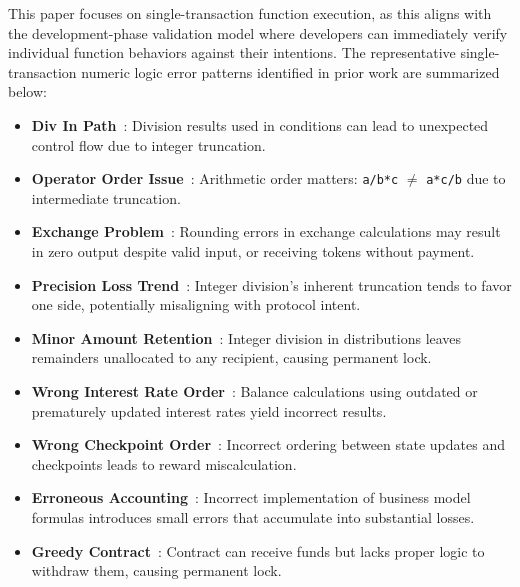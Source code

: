 \documentclass[pdflatex,sn-basic]{sn-jnl}%
\theoremstyle{thmstyleone}%
\theoremstyle{thmstyletwo}%
\theoremstyle{thmstylethree}%
\begin{document}
This paper focuses on single-transaction function execution, as this aligns with the development-phase validation model where developers can immediately verify individual function behaviors against their intentions.
The representative single-transaction numeric logic error patterns identified in prior work are summarized below:

\begin{itemize}
    \item \textbf{Div In Path}~\citep{numscout}: Division results used in conditions can lead to unexpected control flow due to integer truncation.

    \item \textbf{Operator Order Issue}~\citep{numscout}: Arithmetic order matters: \texttt{a/b*c} $\neq$ \texttt{a*c/b} due to intermediate truncation.

    \item \textbf{Exchange Problem}~\citep{numscout}: Rounding errors in exchange calculations may result in zero output despite valid input, or receiving tokens without payment.

    \item \textbf{Precision Loss Trend}~\citep{numscout}: Integer division's inherent truncation tends to favor one side, potentially misaligning with protocol intent.

    \item \textbf{Minor Amount Retention}~\citep{numscout}: Integer division in distributions leaves remainders unallocated to any recipient, causing permanent lock.

    \item \textbf{Wrong Interest Rate Order}~\citep{gptscan}: Balance calculations using outdated or prematurely updated interest rates yield incorrect results.

    \item \textbf{Wrong Checkpoint Order}~\citep{gptscan}: Incorrect ordering between state updates and checkpoints leads to reward miscalculation.

    \item \textbf{Erroneous Accounting}~\citep{exploitablebugs}: Incorrect implementation of business model formulas introduces small errors that accumulate into substantial losses.

    \item \textbf{Greedy Contract}~\citep{flyinointment}: Contract can receive funds but lacks proper logic to withdraw them, causing permanent lock.

\end{itemize}
\end{document}
